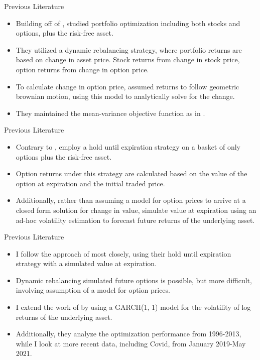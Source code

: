 \documentclass[9pt]{beamer}
\begin{document}
\begin{frame}{Previous Literature}
    \begin{itemize}
        \item Building off of \cite{markowitz}, \cite{zhao2018markowitz} studied portfolio optimization including both stocks and options, plus the risk-free asset.
        \item They utilized a dynamic rebalancing strategy, where portfolio returns are based on change in asset price. Stock returns from change in stock price, option returns from change in option price.
        \item To calculate change in option price, \cite{zhao2018markowitz} assumed returns to follow geometric brownian motion, using this model to analytically solve for the change.
        \item They maintained the mean-variance objective function as in \cite{markowitz}.
    \end{itemize}
\end{frame}

\begin{frame}{Previous Literature}
    \begin{itemize}
        \item Contrary to \cite{zhao2018markowitz}, \cite{faias2017optimal} employ a hold until expiration strategy on a basket of only options plus the risk-free asset.
        \item Option returns under this strategy are calculated based on the value of the option at expiration and the initial traded price.
        \item Additionally, rather than assuming a model for option prices to arrive at a closed form solution for change in value, \cite{faias2017optimal} simulate value at expiration using an ad-hoc volatility estimation to forecast future returns of the underlying asset.
    \end{itemize}
\end{frame}

\begin{frame}{Previous Literature}
    \begin{itemize}
        \item I follow the approach of \cite{faias2017optimal} most closely, using their hold until expiration strategy with a simulated value at expiration.
        \item Dynamic rebalancing simulated future options is possible, but more difficult, involving assumption of a model for option prices.
        \item I extend the work of \cite{faias2017optimal} by using a GARCH(1, 1) model for the volatility of log returns of the underlying asset.
        \item Additionally, they analyze the optimization performance from 1996-2013, while I look at more recent data, including Covid, from January 2019-May 2021.
    \end{itemize}
\end{frame}
\end{document}

